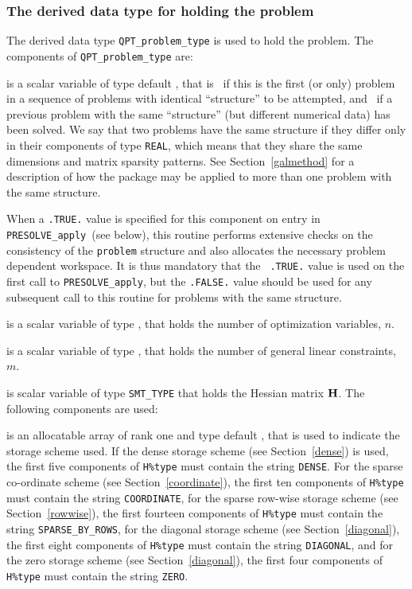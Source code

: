 \documentclass{galahad}
\newcommand{\packagename}{PRESOLVE}
\begin{document}

\subsubsection{The derived data type for holding the problem}\label{typeprob}
The derived data type {\tt QPT\_problem\_type} is used to hold
the problem. The components of {\tt QPT\_problem\_type}
are:

\begin{description}

 is a scalar variable of type default \logical,
 that is \true\ if this is the first (or only) problem in a sequence of
 problems with identical ``structure'' to be attempted, and \false\ if
 a previous problem with the same ``structure'' (but different
 numerical data) has been solved. We say that two problems have the same
 structure if they differ only in their components of type {\tt REAL}, which
 means that they share the same dimensions and matrix sparsity patterns.
 See Section~\ref{galmethod} for a description of how the package may be
 applied to  more than one problem with the same structure.

\noindent
 When a {\tt .TRUE.} value is specified for this component on entry in {\tt
 \packagename\_apply}\ (see below), this routine performs extensive checks on
 the consistency of the {\tt problem} structure and also allocates the
 necessary problem dependent workspace.  It is thus mandatory that the {\tt
 .TRUE.} value is used on the first call to {\tt \packagename\_apply}, but
 the {\tt .FALSE.} value should be used for any subsequent call to this
 routine for problems with the same structure.

 is a scalar variable of type \integer,
 that holds the number of optimization variables, $n$.

 is a scalar variable of type \integer,
 that holds the number of general linear constraints, $m$.

 is scalar variable of type {\tt SMT\_TYPE}
that holds the Hessian matrix ${\mathbf{H}}$. The following components
are used:

\begin{description}

 is an allocatable array of rank one and type default \character, that
is used to indicate the storage scheme used. If the dense storage scheme
(see Section~\ref{dense}) is used,
the first five components of {\tt H\%type} must contain the
string {\tt DENSE}.
For the sparse co-ordinate scheme (see Section~\ref{coordinate}),
the first ten components of {\tt H\%type} must contain the
string {\tt COORDINATE},
for the sparse row-wise storage scheme (see Section~\ref{rowwise}),
the first fourteen components of {\tt H\%type} must contain the
string {\tt SPARSE\_BY\_ROWS},
for the diagonal storage scheme (see Section~\ref{diagonal}),
the first eight components of {\tt H\%type} must contain the
string {\tt DIAGONAL},
and for the zero storage scheme (see Section~\ref{diagonal}),
the first four components of {\tt H\%type} must contain the
string {\tt ZERO}.


\end{description}
\end{description}
\end{document}
